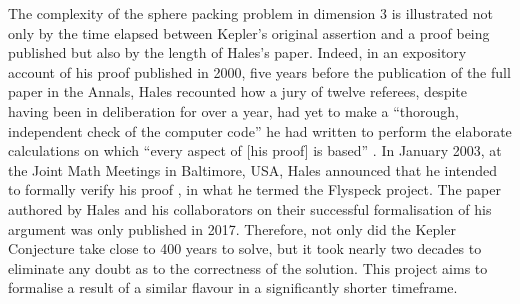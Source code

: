The complexity of the sphere packing problem in dimension $3$ is illustrated not only by the time elapsed between Kepler's original assertion and a proof being published but also by the length of Hales's paper. Indeed, in an expository account of his proof published in 2000, five years before the publication of the full paper in the Annals, Hales recounted how a jury of twelve referees, despite having been in deliberation for over a year, had yet to make a ``thorough, independent check of the computer code'' he had written to perform the elaborate calculations on which ``every aspect of [his proof] is based'' \cite{CannonHoney}. In January 2003, at the Joint Math Meetings in Baltimore, USA, Hales announced that he intended to formally verify his proof \cite{HalesKeplerFormal}, in what he termed the Flyspeck project. The paper authored by Hales and his collaborators on their successful formalisation of his argument was only published in 2017. Therefore, not only did the Kepler Conjecture take close to 400 years to solve, but it took nearly two decades to eliminate any doubt as to the correctness of the solution. This project aims to formalise a result of a similar flavour in a significantly shorter timeframe.